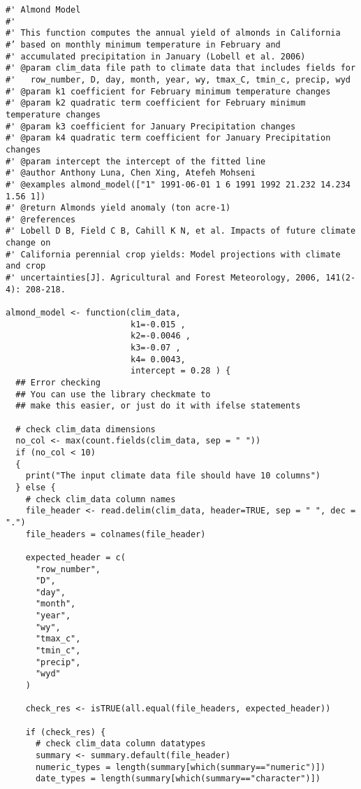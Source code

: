\documentclass[
]{article}
\begin{document}
\begin{verbatim}
#' Almond Model
#'
#' This function computes the annual yield of almonds in California
#’ based on monthly minimum temperature in February and 
#' accumulated precipitation in January (Lobell et al. 2006)
#' @param clim_data file path to climate data that includes fields for 
#'   row_number, D, day, month, year, wy, tmax_C, tmin_c, precip, wyd
#' @param k1 coefficient for February minimum temperature changes 
#' @param k2 quadratic term coefficient for February minimum temperature changes
#' @param k3 coefficient for January Precipitation changes
#' @param k4 quadratic term coefficient for January Precipitation changes
#' @param intercept the intercept of the fitted line
#' @author Anthony Luna, Chen Xing, Atefeh Mohseni
#' @examples almond_model(["1" 1991-06-01 1 6 1991 1992 21.232 14.234 1.56 1])
#' @return Almonds yield anomaly (ton acre-1)
#' @references
#' Lobell D B, Field C B, Cahill K N, et al. Impacts of future climate change on 
#' California perennial crop yields: Model projections with climate and crop 
#' uncertainties[J]. Agricultural and Forest Meteorology, 2006, 141(2-4): 208-218.

almond_model <- function(clim_data, 
                         k1=-0.015 , 
                         k2=-0.0046 , 
                         k3=-0.07 ,
                         k4= 0.0043, 
                         intercept = 0.28 ) {
  ## Error checking
  ## You can use the library checkmate to
  ## make this easier, or just do it with ifelse statements
  
  # check clim_data dimensions
  no_col <- max(count.fields(clim_data, sep = " "))
  if (no_col < 10)
  {
    print("The input climate data file should have 10 columns")
  } else {
    # check clim_data column names
    file_header <- read.delim(clim_data, header=TRUE, sep = " ", dec = ".")
    file_headers = colnames(file_header)
    
    expected_header = c(
      "row_number",
      "D",
      "day",
      "month",
      "year",
      "wy",
      "tmax_c",
      "tmin_c",
      "precip",
      "wyd"
    ) 
    
    check_res <- isTRUE(all.equal(file_headers, expected_header))
    
    if (check_res) {
      # check clim_data column datatypes
      summary <- summary.default(file_header)
      numeric_types = length(summary[which(summary=="numeric")])
      date_types = length(summary[which(summary=="character")])
      

\end{verbatim}
\end{document}
